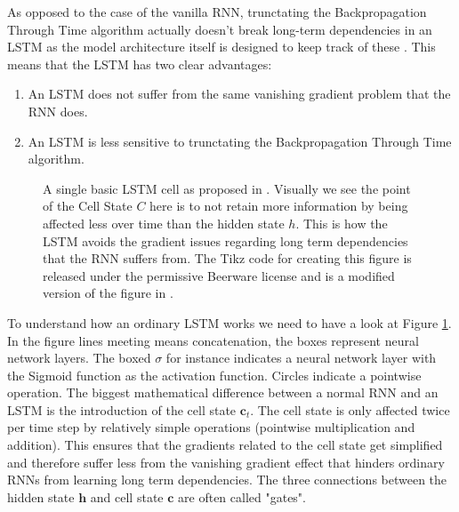 As opposed to the case of the vanilla RNN, trunctating the Backpropagation Through 
Time algorithm actually doesn't break long-term dependencies in an LSTM as the 
model architecture itself is designed to keep track of these \citep{graves2012long}.
This means that the LSTM has two clear advantages:
\begin{enumerate}
	\item An LSTM does not suffer from the same vanishing gradient problem that the RNN does.
	\item An LSTM is less sensitive to trunctating the Backpropagation Through Time algorithm.
\end{enumerate}

\begin{figure}
\centering
    
    \caption[An LSTM cell.]{A single basic LSTM cell as proposed in \citet{hochreiter1997long}. Visually we see the point of the Cell State $C$ here is to not retain more information 
by being affected less over time than the hidden state $h$. This is how the LSTM 
avoids the gradient issues regarding long term dependencies that the RNN suffers 
from.
The Tikz code for creating this figure is released under the permissive Beerware license 
and is a modified version of the figure in \citet{tikzlstm}.
}
\label{LSTM figure}
\end{figure}
To understand how an ordinary LSTM works we need to have a look at Figure \ref{LSTM figure}.
In the figure lines meeting means concatenation, the boxes represent neural network layers. The boxed $\sigma$ for instance indicates a neural network layer with the Sigmoid function 
as the activation function. Circles indicate a pointwise operation.
The biggest mathematical difference between a normal RNN and an LSTM is the introduction 
of the cell state $\bm{c}_t$. The cell state is only affected twice per time step 
by relatively simple operations (pointwise multiplication and addition). This 
ensures that the gradients related to the cell state get simplified and therefore 
suffer less from the vanishing gradient effect that hinders ordinary RNNs from 
learning long term dependencies. The three connections between the hidden state 
$\bm{h}$ and cell state $\bm{c}$ are often called "gates".
